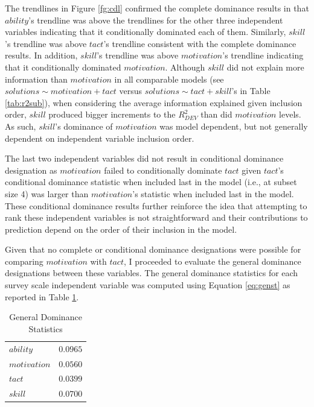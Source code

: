 \documentclass[man]{apa7}
\begin{document}
	The trendlines in Figure \ref{fg:cdl} confirmed the complete dominance results in that $ability$'s trendline was above the trendlines for the other three independent variables indicating that it conditionally dominated each of them.
	Similarly, $skill$'s trendline was above $tact$'s trendline consistent with the complete dominance results.
	In addition, $skill$'s trendline was above $motivation$'s trendline indicating that it conditionally dominated $motivation$.
	Although $skill$ did not explain more information than $motivation$ in all comparable models (see $solutions \sim motivation + tact$ versus $solutions \sim tact + skill$'s in Table \ref{tab:r2sub}), when considering the average information explained given inclusion order, $skill$ produced bigger increments to the $R^2_{DEV}$ than did $motivation$ levels. 
	As such, $skill$'s dominance of $motivation$ was model dependent, but not generally dependent on independent variable inclusion order.
	
	The last two independent variables did not result in conditional dominance designation as $motivation$ failed to conditionally dominate $tact$ given $tact$'s conditional dominance statistic when included last in the model (i.e., at subset size 4) was larger than $motivation$'s statistic when included last in the model.
	These conditional dominance results further reinforce the idea that attempting to rank these independent variables is not straightforward and their contributions to prediction depend on the order of their inclusion in the model. 
	
	Given that no complete or conditional dominance designations were possible for comparing $motivation$ with $tact$, I proceeded to evaluate the general dominance designations between these variables. 
	The general dominance statistics for each survey scale independent variable was computed using Equation \ref{eq:genst} as reported in Table \ref{tab:gen}.
	
	\begin{table}[h!]
		\centering
		\caption{\centering General Dominance Statistics}
		\begin{tabular}{l|r}
			\hline 
			$ability$ & $0.0965$ \\ 
			$motivation$ & $0.0560$ \\ 
			$tact$ & $0.0399$ \\ 
			$skill$ & $0.0700$ \\ 
			\hline 
		\end{tabular}
		\label{tab:gen}
	\end{table}
\end{document}
